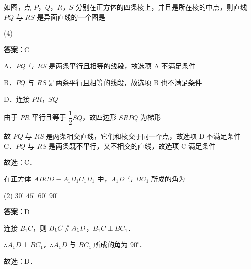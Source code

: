 \begin{example}[\bkstar{2}{5}]
如图，点 $P$，$Q$，$R$，$S$ 分别在正方体的四条棱上，并且是所在棱的中点，则直线 $PQ$ 与 $RS$ 是异面直线的一个图是
\begin{tasks}(4)
    \task {}
    \task {}
    \task {}
    \task {}
\end{tasks}
\end{example}
\begin{solution}
\textbf{答案：}C

A．$PQ$ 与 $RS$ 是两条平行且相等的线段，故选项 A 不满足条件

B．$PQ$ 与 $RS$ 是两条平行且相等的线段，故选项 B 也不满足条件

D．连接 $PR$，$SQ$

由于 $PR$ 平行且等于 $\dfrac{1}{2}SQ$，故四边形 $SRPQ$ 为梯形

故 $PQ$ 与 $RS$ 是两条相交直线，它们和棱交于同一个点，故选项 D 不满足条件
C．$PQ$ 与 $RS$ 是两条既不平行，又不相交的直线，故选项 C 满足条件

故选：C．
\end{solution}

\vspace{2em}


\begin{example}[\bkstar{2}{5}]
在正方体 $ABCD-A_1B_1C_1D_1$ 中，$A_1D$ 与 $BC_1$ 所成的角为
\begin{tasks}(2)
    \task $30^{\circ}$
    \task $45^{\circ}$
    \task $60^{\circ}$
    \task $90^{\circ}$
\end{tasks}
\end{example}
\begin{solution}
\textbf{答案：}D

连接 $B_1C$，则 $B_1C\mathrel{/\mkern-5mu/} A_1D$，$B_1C\perp BC_1$．

$\therefore A_1D\perp BC_1$，$\therefore A_1D$ 与 $BC_1$ 所成的角为 $90^{\circ}$．

故选：D．
\end{solution}

\vspace{2em}

